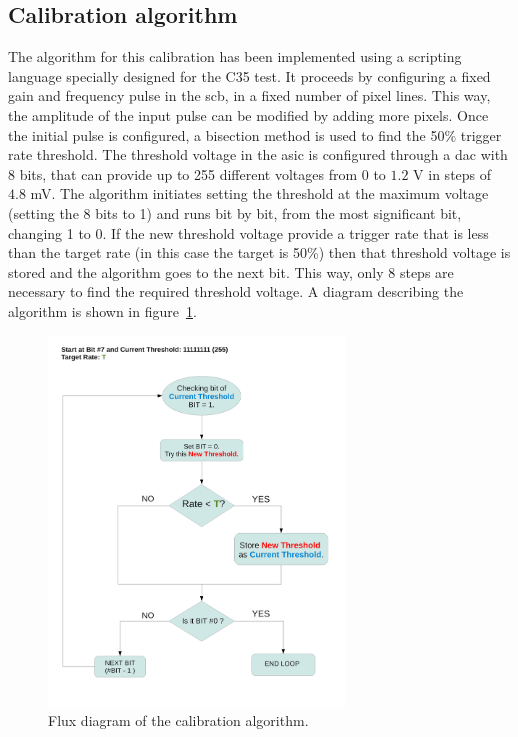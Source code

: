 \documentclass[main.tex]{subfiles}
\begin{document}
\subsection{Calibration algorithm}

The algorithm for this calibration has been implemented using a scripting language specially designed for the C35 test. It proceeds by configuring a fixed gain and frequency pulse in the \gls{scb}, in a fixed number of pixel lines. This way, the amplitude of the input pulse can be modified by adding more pixels. Once the initial pulse is configured, a bisection method is used to find the 50\% trigger rate threshold. The threshold voltage in the \gls{asic} is configured through a \gls{dac} with 8 bits, that can provide up to 255 different voltages from 0 to $1.2$ V in steps of $4.8$ mV. The algorithm initiates setting the threshold at the maximum voltage (setting the 8 bits to 1) and runs bit by bit, from the most significant bit, changing 1 to 0. If the new threshold voltage provide a trigger rate that is less than the target rate (in this case
the target is 50\%) then that threshold voltage is stored and the algorithm goes to the next bit. This way, only 8 steps are necessary to find the required threshold voltage. A diagram describing the algorithm is shown in figure~\ref{fig:calalgorith}.
\begin{figure}[h]
  \centering
  \includegraphics[width=0.7\textwidth]{./Pictures/calibrationalgorithm.pdf}
  \caption{Flux diagram of the calibration algorithm.}
  \label{fig:calalgorith}
\end{figure}
\end{document}
